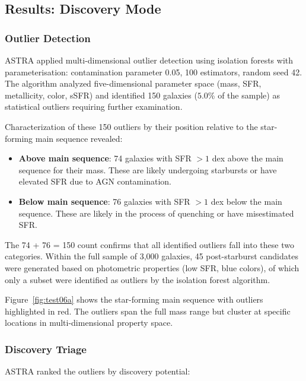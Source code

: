 \documentclass[usenatbib]{rasti}
\begin{document}
\subsection{Results: Discovery Mode}

\subsubsection{Outlier Detection}

ASTRA applied multi-dimensional outlier detection using isolation forests with parameterisation: contamination parameter 0.05, 100 estimators, random seed 42. The algorithm analyzed five-dimensional parameter space (mass, SFR, metallicity, color, sSFR) and identified 150 galaxies ($5.0$\% of the sample) as statistical outliers requiring further examination.

Characterization of these 150 outliers by their position relative to the star-forming main sequence revealed:
\begin{itemize}
\item \textbf{Above main sequence}: 74 galaxies with SFR $>1$ dex above the main sequence for their mass. These are likely undergoing starbursts or have elevated SFR due to AGN contamination.
\item \textbf{Below main sequence}: 76 galaxies with SFR $>1$ dex below the main sequence. These are likely in the process of quenching or have misestimated SFR.
\end{itemize}
The 74 + 76 = 150 count confirms that all identified outliers fall into these two categories. Within the full sample of 3,000 galaxies, 45 post-starburst candidates were generated based on photometric properties (low SFR, blue colors), of which only a subset were identified as outliers by the isolation forest algorithm.

Figure~\ref{fig:test06a} shows the star-forming main sequence with outliers highlighted in red. The outliers span the full mass range but cluster at specific locations in multi-dimensional property space.

\subsubsection{Discovery Triage}

ASTRA ranked the outliers by discovery potential:
\end{document}
